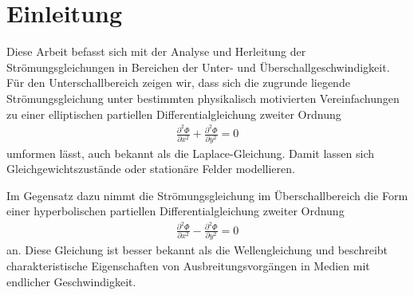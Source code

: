 %
%
%
%
\section{Einleitung\label{ueberschall:Einleitung}}
Diese Arbeit befasst sich mit der Analyse und Herleitung 
der Strömungsgleichungen in Bereichen der
Unter- und Überschallgeschwindigkeit. 
%
Für den Unterschallbereich zeigen wir, 
%
%
dass sich die zugrunde liegende Strömungsgleichung 
unter bestimmten physikalisch motivierten 
Vereinfachungen zu einer elliptischen 
partiellen Differentialgleichung zweiter Ordnung 
%
%
\begin{align*}
    \frac{\partial^2 \Phi}{\partial x^2} 
    +
    \frac{\partial^2 \Phi}{\partial y^2} 
    = 
    0
\end{align*}
umformen lässt,
auch bekannt als die Laplace-Gleichung.
%
Damit lassen sich Gleichgewichtszustände oder
stationäre Felder modellieren.

Im Gegensatz dazu nimmt die Strömungsgleichung 
im Überschallbereich die Form einer hyperbolischen 
partiellen Differentialgleichung zweiter Ordnung
\begin{align}
\frac{\partial^2 \Phi}{\partial x^2}
- 
\frac{\partial^2 \Phi}{\partial y^2} 
= 
0\label{eq:wellengleichung}
\end{align}
an.
Diese Gleichung ist besser bekannt als die Wellengleichung 
und beschreibt charakteristische Eigenschaften 
von Ausbreitungsvorgängen in Medien mit endlicher 
Geschwindigkeit.

